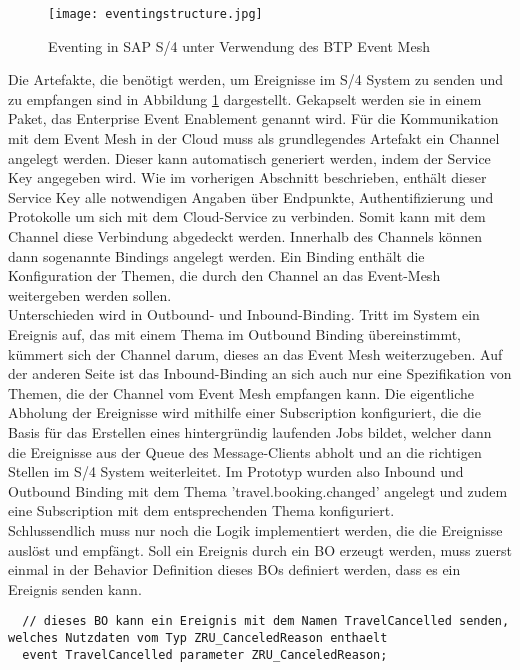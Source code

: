   \begin{figure}
    \centering
    \texttt{[image: eventingstructure.jpg]}
    \caption[Eventing in SAP S/4 unter Verwendung des BTP Event Mesh]{Eventing in SAP S/4 unter Verwendung des BTP Event Mesh \footnotemark}
    \label{BEstructure}
  \end{figure}
  Die Artefakte, die benötigt werden, um Ereignisse im S/4 System zu senden und zu empfangen sind in Abbildung \ref{BEstructure} dargestellt. Gekapselt werden sie in einem Paket, das Enterprise Event Enablement genannt wird. Für die Kommunikation mit dem Event Mesh in der Cloud muss als grundlegendes Artefakt ein Channel angelegt werden. Dieser kann automatisch generiert werden, indem der Service Key angegeben wird. Wie im vorherigen Abschnitt beschrieben, enthält dieser Service Key alle notwendigen Angaben über Endpunkte, Authentifizierung und Protokolle um sich mit dem Cloud-Service zu verbinden. Somit kann mit dem Channel diese Verbindung abgedeckt werden. Innerhalb des Channels können dann sogenannte Bindings angelegt werden. Ein Binding enthält die Konfiguration der Themen, die durch den Channel an das Event-Mesh weitergeben werden sollen.\\ Unterschieden wird in Outbound- und Inbound-Binding. Tritt im System ein Ereignis auf, das mit einem Thema im Outbound Binding übereinstimmt, kümmert sich der Channel darum, dieses an das Event Mesh weiterzugeben. Auf der anderen Seite ist das Inbound-Binding an sich auch nur eine Spezifikation von Themen, die der Channel vom Event Mesh empfangen kann. Die eigentliche Abholung der Ereignisse wird mithilfe einer Subscription konfiguriert, die die Basis für das Erstellen eines hintergründig laufenden Jobs bildet, welcher dann die Ereignisse aus der Queue des Message-Clients abholt und an die richtigen Stellen im S/4 System weiterleitet. Im Prototyp wurden also Inbound und Outbound Binding mit dem Thema 'travel.booking.changed' angelegt und zudem eine Subscription mit dem entsprechenden Thema konfiguriert.\\

Schlussendlich muss nur noch die Logik implementiert werden, die die Ereignisse auslöst und empfängt. Soll ein Ereignis durch ein \ac{BO} erzeugt werden, muss zuerst einmal in der Behavior Definition dieses \acp{BO} definiert werden, dass es ein Ereignis senden kann.\\

\begin{lstlisting}
  // dieses BO kann ein Ereignis mit dem Namen TravelCancelled senden, welches Nutzdaten vom Typ ZRU_CanceledReason enthaelt
  event TravelCancelled parameter ZRU_CanceledReason;
\end{lstlisting}

